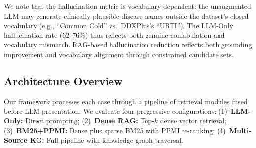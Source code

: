 \documentclass[runningheads]{llncs}
\begin{document}
We note that the hallucination metric is vocabulary-dependent: the unaugmented LLM may generate clinically plausible disease names outside the dataset's closed vocabulary (e.g., ``Common Cold'' vs.\ DDXPlus's ``URTI''). The LLM-Only hallucination rate (62--76\%) thus reflects both genuine confabulation and vocabulary mismatch. RAG-based hallucination reduction reflects both grounding improvement and vocabulary alignment through constrained candidate sets.

\subsection{Architecture Overview}

Our framework processes each case through a pipeline of retrieval modules fused before LLM presentation. We evaluate four progressive configurations:
(1)~\textbf{LLM-Only:} Direct prompting;
(2)~\textbf{Dense RAG:} Top-$k$ dense vector retrieval;
(3)~\textbf{BM25+PPMI:} Dense plus sparse BM25 with PPMI re-ranking;
(4)~\textbf{Multi-Source KG:} Full pipeline with knowledge graph traversal.
\end{document}
